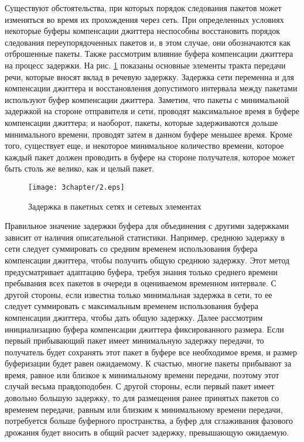 Существуют обстоятельства, при которых порядок следования пакетов может изменяться во время их прохождения через сеть. При определенных условиях некоторые буферы компенсации джиттера неспособны восстановить порядок следования переупорядоченных пакетов и, в этом случае, они обозначаются как отброшенные пакеты.
Также рассмотрим влияние буфера компенсации джиттера на процесс задержки. На рис. \ref{img3:delNode} показаны основные элементы тракта передачи речи, которые вносят вклад в речевую задержку. Задержка сети переменна и для компенсации джиттера и восстановления допустимого интервала между пакетами используют буфер компенсации джиттера. Заметим, что пакеты с минимальной задержкой на стороне отправителя и сети, проводят максимальное время в буфере компенсации джиттера; и наоборот, пакеты, которые задерживаются дольше минимального времени, проводят затем в данном буфере меньшее время. Кроме того, существует еще, и некоторое минимальное количество времени, которое каждый пакет должен проводить в буфере на стороне получателя, которое может быть столь же велико, как и целый пакет.

\begin{figure} [h]
  \center
\texttt{[image: 3chapter/2.eps]}
  \caption{Задержка в пакетных сетях и сетевых элементах}
  \label{img3:delNode}
\end{figure}

Правильное значение задержки буфера для объединения с другими задержками зависит от наличия описательной статистики. Например, среднюю задержку в сети следует суммировать со средним временем использования буфера компенсации джиттера, чтобы получить общую среднюю задержку. Этот метод предусматривает адаптацию буфера, требуя знания только среднего времени пребывания всех пакетов в очереди в оцениваемом временном интервале. С другой стороны, если известна только минимальная задержка в сети, то ее следует суммировать с максимальным временем использования буфера компенсации джиттера, чтобы дать общую задержку.
Далее рассмотрим инициализацию буфера компенсации джиттера фиксированного размера. Если первый прибывающий пакет имеет минимальную задержку передачи, то получатель будет сохранять этот пакет в буфере все необходимое время, и размер буферизации будет равен ожидаемому. К счастью, многие пакеты прибывают за время, равное или близкое к минимальному времени передачи, поэтому этот случай весьма правдоподобен. 
С другой стороны, если первый пакет имеет довольно большую задержку, то для размещения ранее принятых пакетов со временем передачи, равным или близким к минимальному времени передачи, потребуется больше буферного пространства, а буфер для сглаживания фазового дрожания будет вносить в общий расчет задержку, превышающую ожидаемую.

